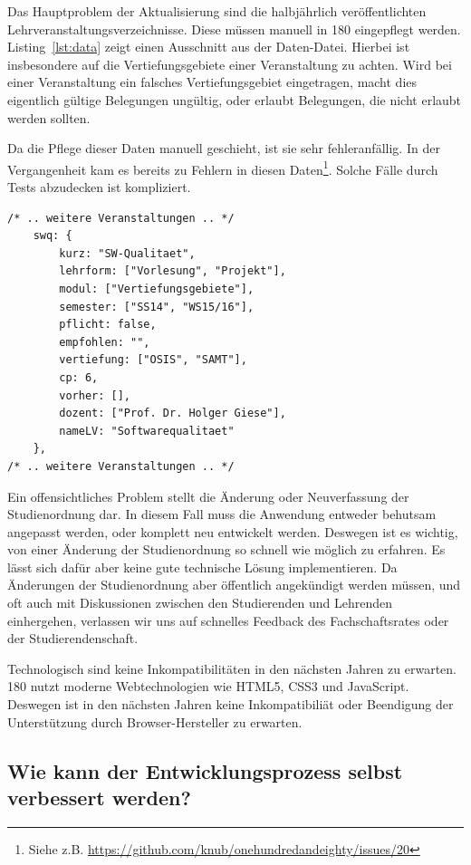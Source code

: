 \documentclass[ngerman]{article}
\begin{document}
Das Hauptproblem der Aktualisierung sind die halbjährlich veröffentlichten Lehrveranstaltungsverzeichnisse.
Diese müssen manuell in 180 eingepflegt werden.
Listing~\ref{lst:data} zeigt einen Ausschnitt aus der Daten-Datei.
Hierbei ist insbesondere auf die Vertiefungsgebiete einer Veranstaltung zu achten.
Wird bei einer Veranstaltung ein falsches Vertiefungsgebiet eingetragen, macht dies eigentlich gültige Belegungen ungültig, oder erlaubt Belegungen, die nicht erlaubt werden sollten.

Da die Pflege dieser Daten manuell geschieht, ist sie sehr fehleranfällig.
In der Vergangenheit kam es bereits zu Fehlern in diesen Daten\footnote{Siehe z.B. \url{https://github.com/knub/onehundredandeighty/issues/20}}.
Solche Fälle durch Tests abzudecken ist kompliziert.

\begin{lstlisting}[caption=Ausschnitt aus \texttt{data.js},label={lst:data},frame=single]
/* .. weitere Veranstaltungen .. */
    swq: {
        kurz: "SW-Qualitaet",
        lehrform: ["Vorlesung", "Projekt"],
        modul: ["Vertiefungsgebiete"],
        semester: ["SS14", "WS15/16"],
        pflicht: false,
        empfohlen: "",
        vertiefung: ["OSIS", "SAMT"],
        cp: 6,
        vorher: [],
        dozent: ["Prof. Dr. Holger Giese"],
        nameLV: "Softwarequalitaet"
    },
/* .. weitere Veranstaltungen .. */
\end{lstlisting}


Ein offensichtliches Problem stellt die Änderung oder Neuverfassung der Studienordnung dar.
In diesem Fall muss die Anwendung entweder behutsam angepasst werden, oder komplett neu entwickelt werden.
Deswegen ist es wichtig, von einer Änderung der Studienordnung so schnell wie möglich zu erfahren.
Es lässt sich dafür aber keine gute technische Lösung implementieren.
Da Änderungen der Studienordnung aber öffentlich angekündigt werden müssen, und oft auch mit Diskussionen zwischen den Studierenden und Lehrenden einhergehen, verlassen wir uns auf schnelles Feedback des Fachschaftsrates oder der Studierendenschaft.

Technologisch sind keine Inkompatibilitäten in den nächsten Jahren zu erwarten.
180 nutzt moderne Webtechnologien wie HTML5, CSS3 und JavaScript.
Deswegen ist in den nächsten Jahren keine Inkompatibiliät oder Beendigung der Unterstützung durch Browser-Hersteller zu erwarten.

\subsection{Wie kann der Entwicklungsprozess selbst verbessert werden?}
\end{document}
